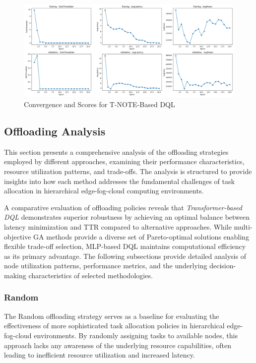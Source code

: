 \documentclass[preprint,3p,authoryear]{elsarticle}
\begin{document}
\begin{figure}[H]
    \centering
    \includegraphics[width=1\linewidth]{figs/T-NOTE/score_plot.png}
    \caption{Convergence and Scores for T-NOTE-Based DQL}
    \label{fig:T-NOTE-score-plot}
\end{figure}



\subsection{Offloading Analysis}\label{subsec:offloading-analysis}

This section presents a comprehensive analysis of the offloading strategies employed by different approaches, examining their performance characteristics, resource utilization patterns, and trade-offs. The analysis is structured to provide insights into how each method addresses the fundamental challenges of task allocation in hierarchical edge-fog-cloud computing environments.

A comparative evaluation of offloading policies reveals that \emph{Transformer-based DQL} demonstrates superior robustness by achieving an optimal balance between latency minimization and TTR compared to alternative approaches. While multi-objective GA methods provide a diverse set of Pareto-optimal solutions enabling flexible trade-off selection, MLP-based DQL maintains computational efficiency as its primary advantage. The following subsections provide detailed analysis of node utilization patterns, performance metrics, and the underlying decision-making characteristics of selected methodologies.

\subsubsection{Random}
\label{subsec:random}

The Random offloading strategy serves as a baseline for evaluating the effectiveness of more sophisticated task allocation policies in hierarchical edge-fog-cloud environments. By randomly assigning tasks to available nodes, this approach lacks any awareness of the underlying resource capabilities, often leading to inefficient resource utilization and increased latency.
\end{document}
